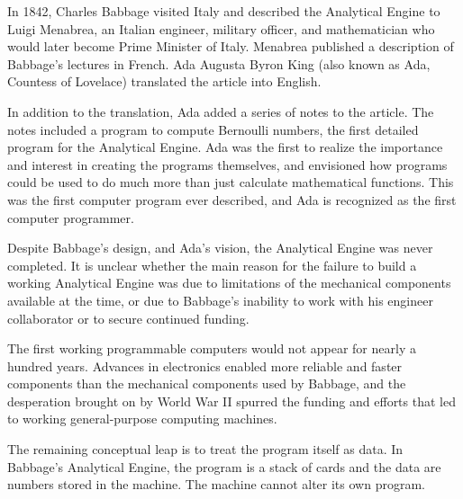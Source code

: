 \begin{schemeregion}
In 1842, Charles Babbage visited Italy and described the Analytical Engine to Luigi Menabrea, an Italian engineer, military officer, and mathematician who would later become Prime Minister of Italy.  Menabrea published a description of Babbage's lectures in French.  Ada Augusta Byron King (also known as Ada, Countess of Lovelace) translated the article into English.  

In addition to the translation, Ada added a series of notes to the article.  The notes included a program to compute Bernoulli numbers, the first detailed program for the Analytical Engine.  Ada was the first to realize the importance and interest in creating the programs themselves, and envisioned how programs could be used to do much more than just calculate mathematical functions.  This was the first computer program ever described, and Ada is recognized as the first computer programmer.

Despite Babbage's design, and Ada's vision, the Analytical Engine was never completed.  It is unclear whether the main reason for the failure to build a working Analytical Engine was due to limitations of the mechanical components available at the time, or due to Babbage's inability to work with his engineer collaborator or to secure continued funding.  

The first working programmable computers would not appear for nearly a hundred years.  Advances in electronics enabled more reliable and faster components than the mechanical components used by Babbage, and the desperation brought on by World War II spurred the funding and efforts that led to working general-purpose computing machines.    

The remaining conceptual leap is to treat the program itself as data.  In Babbage's Analytical Engine, the program is a stack of cards and the data are numbers stored in the machine.  The machine cannot alter its own program.  


\end{schemeregion}
